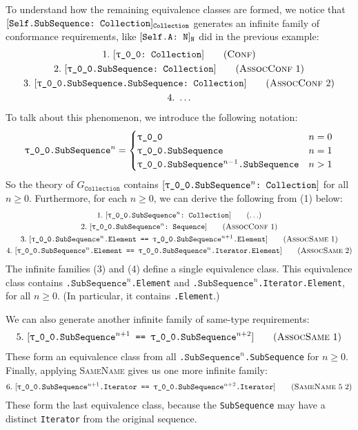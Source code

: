 \documentclass[../generics]{subfiles}
\begin{document}
\begin{example}
To understand how the remaining equivalence classes are formed, we notice that $[\texttt{Self.SubSequence:~Collection}]_\texttt{Collection}$ generates an infinite family of conformance requirements, like $[\texttt{Self.A:~N}]_\texttt{N}$ did in the previous example:
\begin{gather*}
\ConfStep{\rT}{Collection}{1}\\
\AssocConfStep{1}{\rT.SubSequence}{Collection}{2}\\
\AssocConfStep{2}{\rT.SubSequence.SubSequence}{Collection}{3}\\
4.\ \ldots
\end{gather*}
To talk about this phenomenon, we introduce the following notation:
\begin{gather*}
\texttt{\rT.$\texttt{SubSequence}^n$} = \begin{cases}
\rT&n=0\\
\texttt{\rT.SubSequence}&n=1\\
\texttt{\rT.SubSequence}^{n-1}\texttt{.SubSequence}&n>1
\end{cases}
\end{gather*}
So the theory of $G_\texttt{Collection}$ contains $\ConfReq{\rT.$\texttt{SubSequence}^n$}{Collection}$ for all $n\geq 0$. Furthermore, for each $n\geq 0$, we can derive the following from (1) below:
\begin{gather*}
\AnyStep{\ConfReq{\rT.$\texttt{SubSequence}^n$}{Collection}}{1}\\
\AssocConfStep{1}{\rT.$\texttt{SubSequence}^n$}{Sequence}{2}\\
\AssocSameStep{1}{\rT.$\texttt{SubSequence}^n$.Element}{\rT.$\texttt{SubSequence}^{n+1}$.Element}{3}\\
\AssocSameStep{2}{\rT.$\texttt{SubSequence}^n$.Element}{\rT.$\texttt{SubSequence}^n$.Iterator.Element}{4}
\end{gather*}
The infinite families (3) and (4) define a single equivalence class. This equivalence class contains \texttt{\rT.$\texttt{SubSequence}^n$.Element} and \texttt{\rT.$\texttt{SubSequence}^n$.Iterator.Element}, for all $n\geq 0$. (In particular, it contains \texttt{\rT.Element}.)

We can also generate another infinite family of same-type requirements:
\begin{gather*}
\AssocSameStep{1}{\rT.$\texttt{SubSequence}^{n+1}$}{\rT.$\texttt{SubSequence}^{n+2}$}{5}
\end{gather*}
These form an equivalence class from all \texttt{\rT.$\texttt{SubSequence}^n$.SubSequence} for $n\geq 0$. Finally, applying \textsc{SameName} gives us one more infinite family:
\begin{gather*}
\SameNameStep{5}{2}{\rT.$\texttt{SubSequence}^{n+1}$.Iterator}{\rT.$\texttt{SubSequence}^{n+2}$.Iterator}{6}
\end{gather*}
These form the last equivalence class, because the \texttt{SubSequence} may have a distinct \texttt{Iterator} from the original sequence.


\end{example}
\end{document}
